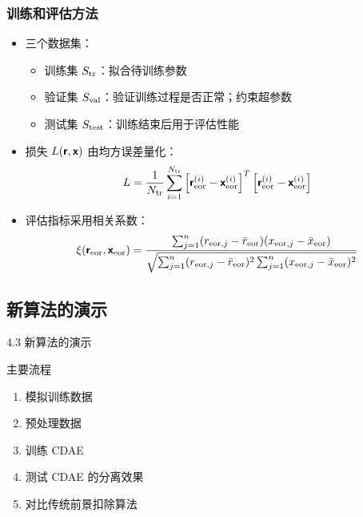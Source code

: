 \documentclass{beamer}
\begin{document}
\begin{frame}[subsec]
  \frametitle{训练和评估方法}
  \begin{itemize}
    \item 三个数据集：
      \begin{itemize}
        \item \alert{训练集 $S_{\text{tr}}$}：拟合待训练参数
        \item \alert{验证集 $S_{\text{val}}$}：验证训练过程是否正常；约束超参数
        \item \alert{测试集 $S_{\text{test}}$}：训练结束后用于评估性能
      \end{itemize}
    \item 损失 $L(\bm{\mathsf{r}}, \bm{\mathsf{x}})$ 由\alert{均方误差}量化：
      \begin{equation}
        L = \frac{1}{N_{\text{tr}}} \sum_{i=1}^{N_{\text{tr}}}
            \left[ \bm{\mathsf{r}}_{\text{eor}}^{(i)} - \bm{\mathsf{x}}_{\text{eor}}^{(i)} \right]^T
            \left[ \bm{\mathsf{r}}_{\text{eor}}^{(i)} - \bm{\mathsf{x}}_{\text{eor}}^{(i)} \right]
      \end{equation}
    \item 评估指标采用\alert{相关系数}：
      \begin{equation}
        \xi(\bm{\mathsf{r}}_{\text{eor}}, \bm{\mathsf{x}}_{\text{eor}})
          = \frac{\sum_{j=1}^{n}(r_{\text{eor},j} - \bar{r}_{\text{eor}})
              (x_{\text{eor},j} - \bar{x}_{\text{eor}})}{
                \sqrt{\sum_{j=1}^{n}(r_{\text{eor},j} - \bar{r}_{\text{eor}})^2
                \sum_{j=1}^{n}(x_{\text{eor},j} - \bar{x}_{\text{eor}})^2}
            }
      \end{equation}
  \end{itemize}
\end{frame}

\subsection{新算法的演示}

\begin{frame}{4.3 新算法的演示}
  \begin{alertblock}{主要流程}
    \begin{enumerate}
      \item 模拟训练数据
      \item 预处理数据
      \item 训练 CDAE
      \item 测试 CDAE 的分离效果
      \item 对比传统前景扣除算法
    \end{enumerate}
  \end{alertblock}
\end{frame}
\end{document}
